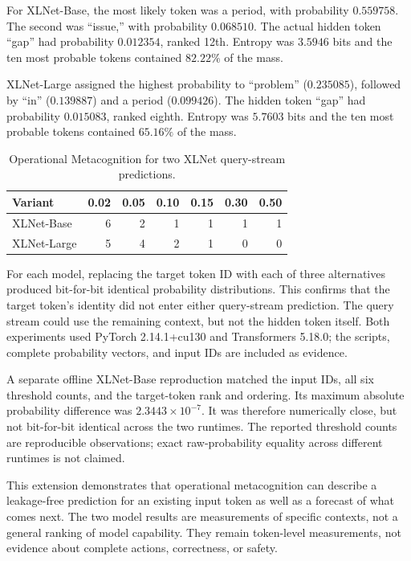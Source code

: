 \documentclass[11pt,a4paper]{article}
\begin{document}
For XLNet-Base, the most likely token was a period, with probability $0.559758$. The second was ``issue,'' with probability $0.068510$. The actual hidden token ``gap'' had probability $0.012354$, ranked 12th. Entropy was $3.5946$ bits and the ten most probable tokens contained $82.22\%$ of the mass.

XLNet-Large assigned the highest probability to ``problem'' ($0.235085$), followed by ``in'' ($0.139887$) and a period ($0.099426$). The hidden token ``gap'' had probability $0.015083$, ranked eighth. Entropy was $5.7603$ bits and the ten most probable tokens contained $65.16\%$ of the mass.

\begin{table}[h]
\centering
\caption{Operational Metacognition for two XLNet query-stream predictions.}
\label{tab:xlnet}
\begin{tabular}{lrrrrrr}
\toprule
Variant & 0.02 & 0.05 & 0.10 & 0.15 & 0.30 & 0.50 \\
\midrule
XLNet-Base & 6 & 2 & 1 & 1 & 1 & 1 \\
XLNet-Large & 5 & 4 & 2 & 1 & 0 & 0 \\
\bottomrule
\end{tabular}
\end{table}

For each model, replacing the target token ID with each of three alternatives produced bit-for-bit identical probability distributions. This confirms that the target token's identity did not enter either query-stream prediction. The query stream could use the remaining context, but not the hidden token itself. Both experiments used PyTorch 2.14.1+cu130 and Transformers 5.18.0; the scripts, complete probability vectors, and input IDs are included as evidence.

A separate offline XLNet-Base reproduction matched the input IDs, all six threshold counts, and the target-token rank and ordering. Its maximum absolute probability difference was $2.3443\times10^{-7}$. It was therefore numerically close, but not bit-for-bit identical across the two runtimes. The reported threshold counts are reproducible observations; exact raw-probability equality across different runtimes is not claimed.

This extension demonstrates that operational metacognition can describe a leakage-free prediction for an existing input token as well as a forecast of what comes next. The two model results are measurements of specific contexts, not a general ranking of model capability. They remain token-level measurements, not evidence about complete actions, correctness, or safety.
\end{document}

